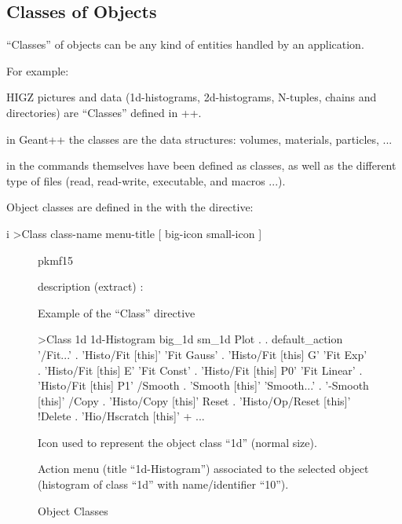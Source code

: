 \subsection{Classes of Objects}
\label{ref:recldef}

``Classes'' of objects can be any kind of entities handled by an application.

For example:
\begin{UL}
\item
HIGZ pictures and \HBOOK{} data (1d-histograms, 2d-histograms, 
N-tuples, chains and directories) are ``Classes'' defined in
\PAW++{}.
\item
in Geant++  the classes are the data structures: volumes, materials, 
particles, ...
\item
in \KUIPMotif{} the commands themselves have been defined as classes,
as well as the different type of files (read, read-write, executable,
and macros ...).
\end{UL}

Object classes are defined in the \CDF{} with the directive:
\begin{Gray}{i}
>Class  class-name  menu-title  [ big-icon  small-icon ]
\end{Gray}

\begin{figure}[tb]
\begin{PICTf}[.45]{pkmf15}
\begin{DLsf}{}
\item[\quad \CDF{} description (extract) :]
\item
\item
\begin{XMPt}{Example of the ``Class'' directive}\footnotesize

>Class 1d 1d-Histogram big_1d sm_1d
 Plot        .  .  default_action%
'/Fit...'    .  'Histo/Fit [this]'
'Fit Gauss'  .  'Histo/Fit [this] G'
'Fit Exp'    .  'Histo/Fit [this] E'
'Fit Const'  .  'Histo/Fit [this] P0'
'Fit Linear' .  'Histo/Fit [this] P1'
 /Smooth     .  'Smooth [this]'
'Smooth...'  .  '-Smooth [this]'
 /Copy       .  'Histo/Copy [this]'
 Reset       .  'Histo/Op/Reset [this]'
!Delete      .  'Hio/Hscratch [this]'
+
...
\end{XMPt}
\end{DLsf}
\end{PICTf}
\begin{EnumZB}
\item Icon used to represent the object class ``1d'' (normal size).
\item Action menu (title ``1d-Histogram'') associated to the selected object 
(histogram of class ``1d'' with name/identifier ``10'').
\vspace{-1\baselineskip}
\end{EnumZB}
\caption{Object Classes}
\label{ref:FIGPKMF15}
\end{figure}

